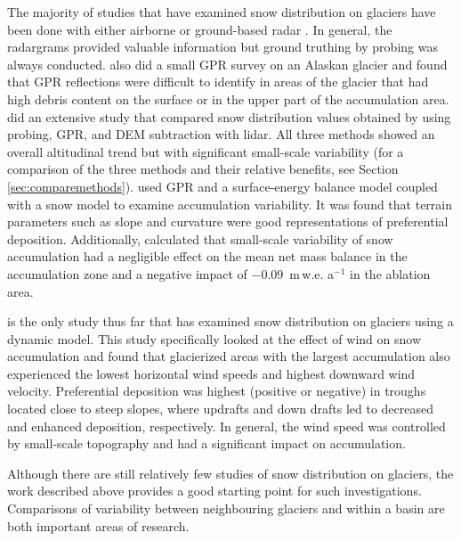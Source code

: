 \documentclass{sfuthesis}
\begin{document}
The majority of studies that have examined snow distribution on glaciers have been done with either airborne or ground-based radar \citep[e.g.][]{Winther1998,Machguth2006, Grabiec2011, Pelt2014,McGrath2015}. In general, the radargrams provided valuable information but ground truthing by probing was always conducted. \cite{Gusmeroli2014} also did a small GPR survey on an Alaskan glacier and found that GPR reflections were difficult to identify in areas of the glacier that had high debris content on the surface or in the upper part of the accumulation area. \cite{Sold2013} did an extensive study that compared snow distribution values obtained by using probing, GPR, and DEM subtraction with lidar. All three methods showed an overall altitudinal trend but with significant small-scale variability (for a comparison of the three methods and their relative benefits, see Section \ref{sec:comparemethods}). \cite{Pelt2014} used GPR and a surface-energy balance model coupled with a snow model to examine accumulation variability. It was found that terrain parameters such as slope and curvature were good representations of preferential deposition. Additionally, \cite{Pelt2014} calculated that small-scale variability of snow accumulation had a negligible effect on the mean net mass balance in the accumulation zone and a negative impact of $-$0.09 \,m\,w.e. a$^{-1}$ in the ablation area.

\cite{Dadic2010} is the only study thus far that has examined snow distribution on glaciers using a dynamic model. This study specifically looked at the effect of wind on snow accumulation and found that glacierized areas with the largest accumulation also experienced the lowest horizontal wind speeds and highest downward wind velocity. Preferential deposition was highest (positive or negative) in troughs located close to steep slopes, where updrafts and down drafts led to decreased and enhanced deposition, respectively. In general, the wind speed was controlled by small-scale topography and had a significant impact on accumulation. 

Although there are still relatively few studies of snow distribution on glaciers, the work described above provides a good starting point for such investigations. Comparisons of variability between neighbouring glaciers and within a basin are both important areas of research.
\end{document}
